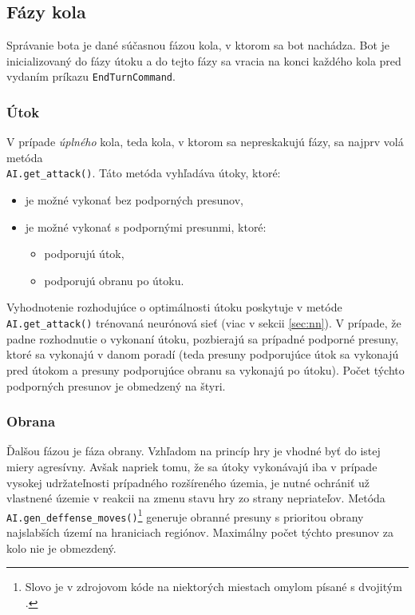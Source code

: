 \documentclass[pdftex, 11pt, a4paper, titlepage]{article}
\newcommand{\code}{\texttt}
\begin{document}
    \subsection{Fázy kola}
    Správanie bota je dané súčasnou fázou kola, v ktorom sa bot nachádza. Bot je inicializovaný do fázy útoku a do tejto fázy sa vracia na konci každého kola
    pred vydaním príkazu \code{EndTurnCommand}.

    \subsubsection*{Útok}
    V prípade \emph{úplného} kola, teda kola, v ktorom sa nepreskakujú fázy, sa najprv volá metóda\\ \code{AI.get\_attack()}. Táto metóda vyhľadáva útoky, ktoré:
    \begin{itemize}
        \item je možné vykonať bez podporných presunov,
        \item je možné vykonať s podpornými presunmi, ktoré:
        \begin{itemize}
            \item podporujú útok,
            \item podporujú obranu po útoku.
        \end{itemize}
    \end{itemize}
    Vyhodnotenie rozhodujúce o optimálnosti útoku poskytuje v metóde \code{AI.get\_attack()} trénovaná neurónová sieť (viac v sekcii \ref{sec:nn}).
    V prípade, že padne rozhodnutie o vykonaní útoku, pozbierajú sa prípadné podporné presuny, ktoré sa vykonajú v danom poradí
    (teda presuny podporujúce útok sa vykonajú pred útokom a presuny podporujúce obranu sa vykonajú po útoku). Počet týchto podporných presunov je obmedzený
    na štyri.

    \subsubsection*{Obrana}
    Ďalšou fázou je fáza obrany. Vzhľadom na princíp hry je vhodné byť do istej miery agresívny. Avšak napriek tomu, že sa útoky vykonávajú iba v prípade vysokej
    udržateľnosti prípadného rozšíreného územia, je nutné ochrániť už vlastnené územie v reakcii na zmenu stavu hry zo strany nepriateľov.
    Metóda \code{AI.gen\_deffense\_moves()}\footnote{Slovo  je v zdrojovom kóde na niektorých miestach omylom písané s dvojitým .}
    generuje obranné presuny s prioritou obrany najslabších území na hraniciach regiónov. Maximálny počet týchto presunov za kolo nie je obmezdený.
\end{document}

